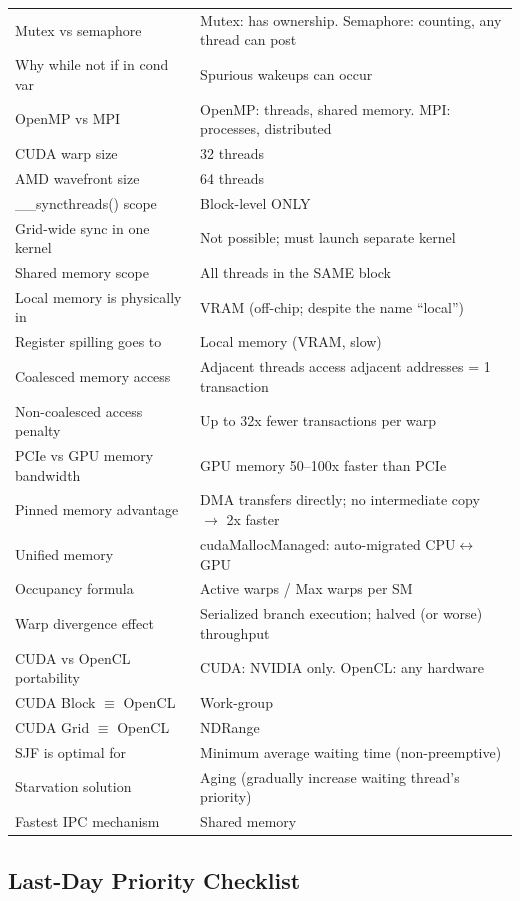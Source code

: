 \documentclass[11pt,a4paper]{article}
\begin{document}
\begin{longtable}{L{5.5cm} L{8cm}}
Mutex vs semaphore & Mutex: has ownership. Semaphore: counting, any thread can post \\
Why while not if in cond var & Spurious wakeups can occur \\
OpenMP vs MPI & OpenMP: threads, shared memory. MPI: processes, distributed \\
CUDA warp size & 32 threads \\
AMD wavefront size & 64 threads \\
\_\_syncthreads() scope & Block-level ONLY \\
Grid-wide sync in one kernel & Not possible; must launch separate kernel \\
Shared memory scope & All threads in the SAME block \\
Local memory is physically in & VRAM (off-chip; despite the name ``local'') \\
Register spilling goes to & Local memory (VRAM, slow) \\
Coalesced memory access & Adjacent threads access adjacent addresses = 1 transaction \\
Non-coalesced access penalty & Up to 32x fewer transactions per warp \\
PCIe vs GPU memory bandwidth & GPU memory 50--100x faster than PCIe \\
Pinned memory advantage & DMA transfers directly; no intermediate copy $\to$ 2x faster \\
Unified memory & cudaMallocManaged: auto-migrated CPU$\leftrightarrow$GPU \\
Occupancy formula & Active warps / Max warps per SM \\
Warp divergence effect & Serialized branch execution; halved (or worse) throughput \\
CUDA vs OpenCL portability & CUDA: NVIDIA only. OpenCL: any hardware \\
CUDA Block $\equiv$ OpenCL & Work-group \\
CUDA Grid $\equiv$ OpenCL & NDRange \\
SJF is optimal for & Minimum average waiting time (non-preemptive) \\
Starvation solution & Aging (gradually increase waiting thread's priority) \\
Fastest IPC mechanism & Shared memory \\
\bottomrule
\end{longtable}

\subsection{Last-Day Priority Checklist}
\end{document}
